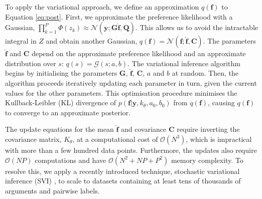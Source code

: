 To apply the variational approach, we define an approximation $q(\mathbf f)$ to Equation \ref{eq:post}. 
First, we approximate the preference likelihood with a Gaussian, $\prod_{k=1}^P \Phi\left( z_k \right) \approx \mathcal{N}(\mathbf y; \mathbf G\hat{\mathbf f}, \mathbf Q)$. This allows us to avoid the intractable integral in $Z$ and obtain another Gaussian, $q(\mathbf f) = \mathcal{N}(\mathbf f; \hat{\mathbf f}, \mathbf C)$. 
The parameters $\hat{\mathbf f}$ and $\mathbf C$ 
depend on the approximate preference likelihood 
and an approximate distribution over $s$: $q(s) = \mathcal{G}(s; a, b)$. 
The variational inference algorithm begins by initialising the parameters $\mathbf G$, $ \hat{\mathbf f}$, $\mathbf C$, $a$ and $b$ at random. Then, the  algorithm proceeds iteratively updating each parameter in turn, given the current values for the other parameters. 
This optimisation procedure minimises the Kullback-Leibler (KL) divergence of $p(\mathbf f |\mathbf y, k_{\theta}, a_0, b_0)$ from $q(\mathbf f)$, causing $q(\mathbf f)$ to converge to an approximate posterior. 

The update equations for the mean $\hat{\mathbf f}$ and covariance $\mathbf C$ require inverting the covariance matrix, $K_{\theta}$, at a computational cost of $\mathcal{O}(N^3)$, which is impractical with more than a few hundred data points. 
Furthermore, the updates also require $\mathcal{O}(NP)$ computations and
have $\mathcal{O}(N^2 + NP + P^2)$ memory complexity.
To resolve this, 
we apply a recently introduced technique, stochastic variational inference (SVI) 
\cite{hoffman2013stochastic,hensman_scalable_2015},
to scale to datasets containing at least tens of thousands of arguments and pairwise labels.

